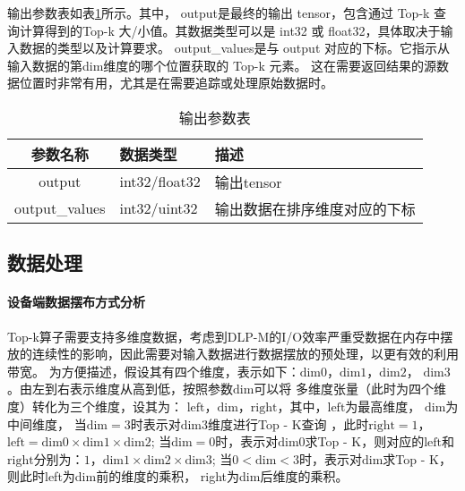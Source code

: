     输出参数表如表\ref{tab:output_tab}所示。其中，
    output是最终的输出 tensor，包含通过 Top-k 查询计算得到的Top-k 大/小值。其数据类型可以是 int32 或 float32，具体取决于输入数据的类型以及计算要求。
    output\_values是与 output 对应的下标。它指示从输入数据的第dim维度的哪个位置获取的 Top-k 元素。
    这在需要返回结果的源数据位置时非常有用，尤其是在需要追踪或处理原始数据时。
    \begin{table}
        \centering
        \caption{输出参数表}
        \label{tab:output_tab}
        \begin{tabular}{cll} %
          \toprule
          参数名称   & 数据类型                                       & 描述                          \\
          \midrule
          output &  int32/float32 & 输出tensor                 \\
          output\_values   & int32/uint32   & 输出数据在排序维度对应的下标              \\
          \bottomrule
        \end{tabular}
    \end{table}

    \subsection{数据处理}
    \paragraph{设备端数据摆布方式分析}
    

    Top-k算子需要支持多维度数据，考虑到DLP-M的I/O效率严重受数据在内存中摆放的连续性的影响，因此需要对输入数据进行数据摆放的预处理，以更有效的利用带宽。
    为方便描述，假设其有四个维度，表示如下：\(\text{dim0}\)，\(\text{dim1}\)，\(\text{dim2}\)，
    \(\text{dim3}\)。由左到右表示维度从高到低，按照参数\(\text{dim}\)可以将
    多维度张量（此时为四个维度）转化为三个维度，设其为：
    \(\text{left}\)，\(\text{dim}\)，\(\text{right}\)，其中，\(\text{left}\)为最高维度，
    \(\text{dim}\)为中间维度，
    当\(\text{dim} = 3\)时表示对\(\text{dim3}\)维度进行Top - K查询
    ，此时\(\text{right} = 1\)，\(\text{left} = \text{dim0}×\text{dim1}×\text{dim2}\);
    当\(\text{dim} = 0\)时，表示对\(\text{dim0}\)求Top - K，则对应的\(\text{left}\)和
    \(\text{right}\)分别为：\(1\)，\(\text{dim1}×\text{dim2}×\text{dim3}\);
    当\(0 < \text{dim} < 3\)时，表示对\(\text{dim}\)求Top - K，则此时left为dim前的维度的乘积，
    right为dim后维度的乘积。

